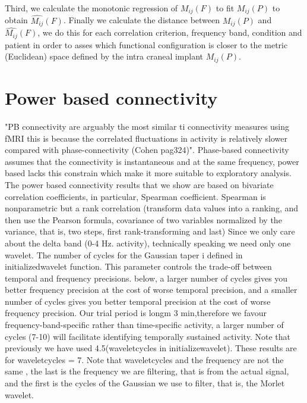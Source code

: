 \documentclass[11pt, onecolumn]{article}
\begin{document}
Third, we calculate the monotonic regression of  $M_{ij}(F)$ to fit $M_{ij}(P)$ to obtain $\hat{M_{ij}}(F)$. Finally we calculate the distance between $M_{ij}(P)$ and $\hat{M_{ij}}(F)$, we do this for each correlation criterion, frequency band, condition and patient in order to asses which functional configuration is closer to the metric (Euclidean) space defined by the intra craneal implant $M_{ij}(P)$.


\section{Power based connectivity}
"PB connectivity are arguably the most similar ti connectivity measures using fMRI  this is because the correlated fluctuations in activity is relatively slower compared with phase-connectivity (Cohen pag324)". 
Phase-based connectivity assumes that the connectivity is instantaneous and at the same frequency, power based lacks this constrain which make it more suitable to exploratory analysis.
The power based connectivity results that we show are based on bivariate correlation coefficients, in particular, Spearman coefficient. Spearman is nonparametric but a rank correlation (transform data values into a ranking, and then use the Pearson formula, covariance of two variables normalized by the variance, that is, two steps, first rank-transforming and last) 
Since we only care about the delta band (0-4 Hz. activity), technically speaking we need only one wavelet.
The number of cycles for the Gaussian taper i defined in initializedwavelet function. This parameter controls the trade-off between temporal and frequency precisions. below, a larger number of cycles gives you better frequency precision at the
cost of worse temporal precision, and a smaller number of cycles gives you better temporal
precision at the cost of worse frequency precision.
Our trial period is longm 3 min,therefore we favour  frequency-band-specific  rather than time-specific activity, a
larger number of cycles (7-10) will facilitate identifying temporally sustained activity. Note that previously we have used 4.5(waveletcycles in initializewavelet). These results  are for waveletcycles = 7. Note that waveletcycles and the frequency are not the same , the last is the frequency we are filtering, that is from the actual signal, and the first is the cycles of the Gaussian we use to filter, that is, the Morlet wavelet.
\end{document}
